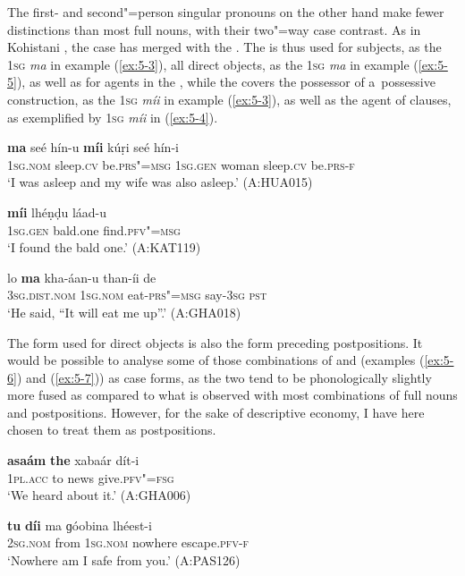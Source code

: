 The first- and second"=person singular pronouns on the other hand make fewer distinctions than most full nouns, with their two"=way case contrast. As in Kohistani \iliShina, the  case has merged with the  \citep[82]{schmidtkohistani2008}. The  is thus used for  subjects, as the \textsc{1sg} \textit{ma} in example (\ref{ex:5-3}), all direct objects, as the \textsc{1sg} \textit{ma} in example (\ref{ex:5-5}), as well as for  agents in the , while the  covers the possessor of a~possessive construction, as the \textsc{1sg} \textit{míi} in example (\ref{ex:5-3}), as well as the agent of  clauses, as exemplified by \textsc{1sg} \textit{míi} in (\ref{ex:5-4}). 


\begin{exe}
\ex
\label{ex:5-3}
\gll \textbf{ma} seé hín-u \textbf{míi} kúṛi seé hín-i \\
	\textsc{1sg.nom} sleep.\textsc{cv} be.\textsc{prs"=msg} \textsc{1sg.gen} woman sleep.\textsc{cv} be.\textsc{prs-f} \\
\glt `I was asleep and my wife was also asleep.' (A:HUA015)

\ex
\label{ex:5-4}
\gll \textbf{míi} lhéṇḍu láad-u \\
	\textsc{1sg.gen} bald.one find.\textsc{pfv"=msg} \\
\glt `I found the bald one.' (A:KAT119)

\ex
\label{ex:5-5}
\gll lo \textbf{ma} kha-áan-u than-íi de \\
	\textsc{3sg.dist.nom} \textsc{1sg.nom} eat-\textsc{prs"=msg} say-\textsc{3sg} \textsc{pst} \\
\glt `He said, ``It will eat me up''.' (A:GHA018)
\end{exe}

The form used for direct objects is also the form preceding postpositions. It would be possible to analyse some of those combinations of  and  (examples (\ref{ex:5-6}) and (\ref{ex:5-7})) as case forms, as the two tend to be phonologically slightly more fused as compared to what is observed with most combinations of full nouns and postpositions. However, for the sake of descriptive economy, I have here chosen to treat them as postpositions. 

\begin{exe}
\ex
\label{ex:5-6}
\gll \textbf{asaám} \textbf{the} xabaár dít-i \\
	1\textsc{pl}.\textsc{acc} to news give.\textsc{pfv"=fsg} \\
\glt `We heard about it.' (A:GHA006)

\ex
\label{ex:5-7}
\gll \textbf{tu} \textbf{díi} ma ɡóobina lhéest-i \\
\textsc{2sg.nom} from \textsc{1sg.nom} nowhere escape.\textsc{pfv-f} \\
\glt `Nowhere am I safe from you.' (A:PAS126)
\end{exe}

